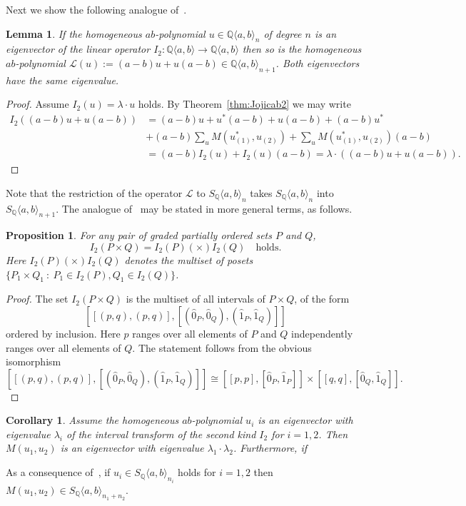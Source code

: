\documentclass[reqno,12pt]{amsart}
\numberwithin{equation}{section}
\newtheorem{lemma}[theorem]{Lemma}
\newtheorem{proposition}[theorem]{Proposition}
\newtheorem{corollary}[theorem]{Corollary}
\newcommand{\0}{\widehat{0}}
\newcommand{\1}{\widehat{1}}
\newcommand{\2}{\widehat{2}}
\newcommand{\II}{I_2}
\newcommand{\lift}{{\mathcal L}}
\newcommand{\Sym}[1]{S_{\mathbb Q}\langle a,b\rangle_{#1}}
\begin{document}
Next we show the following analogue of~\cite[Proposition
  10.9]{Ehrenborg-Readdy-Tch}.  
\begin{lemma}
\label{lemma:Ulift}  
If the homogeneous $ab$-polynomial $u\in {\mathbb Q}\langle
a,b\rangle_n$ of degree $n$ is an eigenvector of the linear operator
$\II: {\mathbb Q}\langle a,b\rangle \rightarrow {\mathbb Q}\langle
a,b\rangle$ then so is the homogeneous $ab$-polynomial
$\lift(u):=(a-b)u+u(a-b)\in 
{\mathbb Q}\langle a,b\rangle_{n+1}$. Both eigenvectors have the same
eigenvalue.  
\end{lemma}
\begin{proof}
  Assume $\II(u)=\lambda\cdot u$ holds. By
  Theorem~\ref{thm:Jojicab2} we may write 
\begin{align*}
  \II((a-b)u+u(a-b))&=(a-b)u+u^*(a-b)+u(a-b)+(a-b)u^*\\
  &+(a-b)\sum_u M(u_{(1)}^*,u_{(2)})+\sum_u M(u_{(1)}^*,u_{(2)})(a-b)\\
  &=(a-b)\II(u)+\II(u)(a-b)=\lambda\cdot ((a-b)u+u(a-b)). 
\end{align*}    
\end{proof}
Note that the restriction of the operator ${\mathcal L}$ to $\Sym{n}$
takes $\Sym{n}$ into $\Sym{n+1}$. The analogue of~\cite[Proposition
  10.8]{Ehrenborg-Readdy-Tch} may be stated in more general terms, as follows.
\begin{proposition}
  \label{prop:Uprod}
  For any pair of graded partially ordered sets $P$ and $Q$,
  $$
\II(P\times Q)=\II(P) (\times) \II(Q) \quad\mbox{holds.}
$$
Here $\II(P) (\times) \II(Q)$ denotes the multiset of posets
$\{P_1\times Q_1\::\: P_1\in \II(P), Q_1\in \II(Q)\}$. 
\end{proposition}
\begin{proof}
The set $\II(P\times Q)$ is the multiset of all intervals of $P\times
Q$, of the form
$$\left[\left[(p,q),(p,q)\right], \left[(\0_P,\0_Q),(\1_P,\1_Q)\right]\right]$$
ordered by inclusion. Here $p$ ranges over all elements of $P$ and $Q$
independently ranges over all elements of $Q$.
The statement follows from the obvious isomorphism 
$$\left[\left[(p,q),(p,q)\right], \left[(\0_P,\0_Q),(\1_P,\1_Q)\right]\right]\cong
\left[\left[p,p\right],\left[\0_P,\1_P\right]\right]\times \left[\left[q,q\right],\left[\0_Q,\1_Q\right]\right].
$$
\end{proof}  

\begin{corollary}
\label{cor:Uprod}  
Assume the homogeneous $ab$-polynomial $u_i$ is an
eigenvector with eigenvalue $\lambda_i$ of the interval transform of the
second kind $\II$ for $i = 1, 2$. Then $M(u_1, u_2)$ is an eigenvector with 
eigenvalue $\lambda_1\cdot \lambda_2$. Furthermore, if  
\end{corollary}  
As a consequence of~\cite[Corollary 4.3]{Ehrenborg-Fox}, if $u_i\in \Sym{n_i}$
holds for $i=1,2$ then  $M(u_1,u_2)\in \Sym{n_1+n_2}$.
\end{document}
